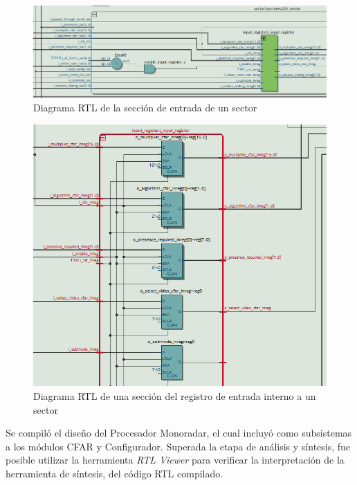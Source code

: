 \begin{figure}
\centering
\includegraphics[scale=0.65, angle=270 ]{./Figures/RTL_cfg_sector_1.png}
\caption{Diagrama RTL de la sección de entrada de un sector}
\label{fig:RTL_cfg_sector_1}
\end{figure}



\begin{figure}
\centering
\includegraphics[scale=0.75]{./Figures/RTL_cfg_input_reg_1.png}
\caption{Diagrama RTL de una sección del registro de entrada interno a un sector}
\label{fig:RTL_cfg_input_reg_1}
\end{figure}




Se compiló el diseño del Procesador Monoradar, el cual incluyó como subsistemas a los módulos CFAR y Configurador. Superada la etapa de análisis y síntesis, fue posible utilizar la herramienta \textit{RTL Viewer} para verificar la interpretación de la herramienta de síntesis, del código RTL compilado.


